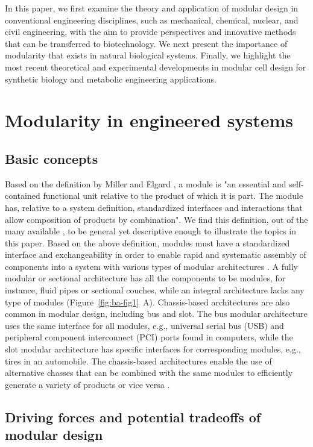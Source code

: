 In this paper, we first examine the theory and application of modular design in conventional engineering disciplines, such as mechanical, chemical, nuclear, and civil engineering, with the aim to provide perspectives and innovative methods that can be transferred to biotechnology.
We next present the importance of modularity that exists in natural biological systems.
Finally, we highlight the most recent theoretical and experimental developments in modular cell design for synthetic biology and metabolic engineering applications.

\section{Modularity in engineered systems}

\subsection{Basic concepts}

Based on the definition by Miller and Elgard \citep{miller1998}, a module is "an essential and self-contained functional unit relative to the product of which it is part.
The module has, relative to a system definition, standardized interfaces and interactions that allow composition of products by combination".
We find this definition, out of the many available \citep{salvador2007}, to be general yet descriptive enough to illustrate the topics in this paper.
Based on the above definition, modules must have a standardized interface and exchangeability in order to enable rapid and systematic assembly of components into a system with various types of modular architectures \citep{ulrich1995}.
A fully modular or sectional architecture has all the components to be modules, for instance, fluid pipes or sectional couches, while an integral architecture lacks any type of modules (Figure~\ref{fig:ba-fig1}~A).
Chassis-based architectures are also common in modular design, including bus and slot.
The bus modular architecture uses the same interface for all modules, e.g., universal serial bus (USB) and peripheral component interconnect (PCI) ports found in computers, while the slot modular architecture has specific interfaces for corresponding modules, e.g., tires in an automobile.
The chassis-based architectures enable the use of alternative chasses that can be combined with the same modules to efficiently generate a variety of products or vice versa \citep{jose2005}.


\subsection{Driving forces and potential tradeoffs of modular design}

